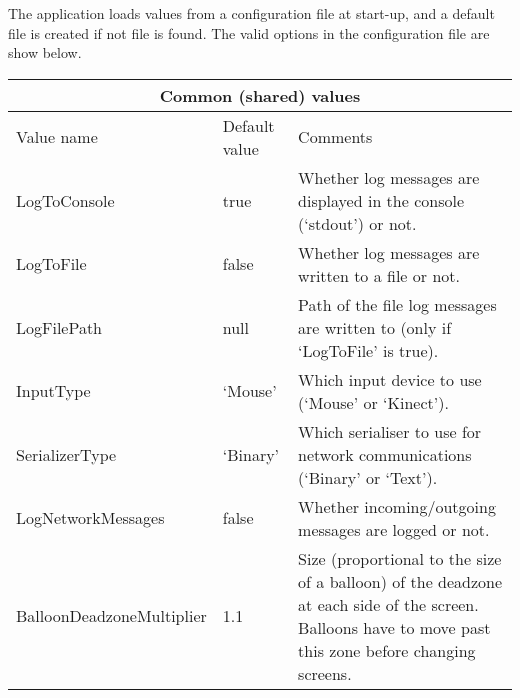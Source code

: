 The application loads values from a configuration file at start-up, and a default file is created if not file is found.
The valid options in the configuration file are show below.

\begin{tabular}{|p{5.0cm}|p{3.0cm}|p{7.6cm}|}
\hline \multicolumn{3}{|c|}{Common (shared) values}  \\ \hline
Value name & Default value & Comments \\ \hline

LogToConsole & true & Whether log messages are displayed in the console (`stdout') or not.  \\ \hline

LogToFile & false & Whether log messages are written to a file or not. \\ \hline

LogFilePath & null & Path of the file log messages are written to (only if `LogToFile' is true). \\ \hline

InputType & `Mouse' & Which input device to use (`Mouse' or `Kinect'). \\ \hline

SerializerType & `Binary' & Which serialiser to use for network communications (`Binary' or `Text'). \\ \hline

LogNetworkMessages & false & Whether incoming/outgoing messages are logged or not. \\ \hline

BalloonDeadzoneMultiplier & 1.1 & Size (proportional to the size of a balloon) of the deadzone at each side of the screen. Balloons have to move past this zone before changing screens. \\ \hline

\end{tabular}

\clearpage{}


